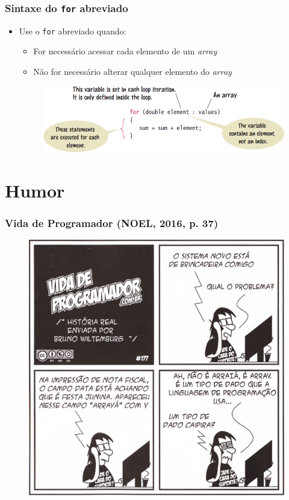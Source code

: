 \documentclass[xcolor={dvipsnames,table},aspectratio=169]{beamer}
\begin{document}
\begin{frame}\frametitle{Sintaxe do \texttt{for} abreviado }
\begin{itemize}
	\item Use o \texttt{for} abreviado quando:
	\begin{itemize}
		\item For necessário acessar cada elemento de um \emph{array}
		\item Não for necessário alterar qualquer elemento do \emph{array}
	\end{itemize}
\begin{figure}[h]
	\includegraphics[height=0.4\paperheight,center]{pucrs-ep-fprog-unidade_06-arrays-laminas-sintaxe_for_abreviado.png}
\end{figure}
\end{itemize}
\end{frame}

\section{Humor}

\begin{frame}\frametitle{Vida de Programador {\tiny (NOEL, 2016, p. 37)}}
\begin{figure}[h]
	\includegraphics[height=0.7\paperheight,center]{pucrs-ep-fprog-unidade_06-arrays-laminas-vida_de_programador.jpg}
\end{figure}
\end{frame}
\end{document}
